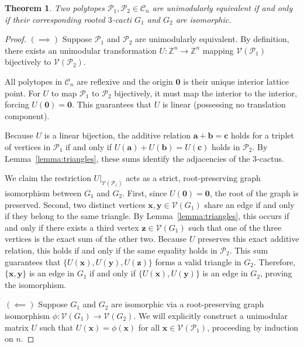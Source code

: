 \documentclass[a4paper,11pt,reqno]{amsart}
\newcommand{\Vv}{{\mathcal V}}
\newtheorem{theorem}{Theorem}[section]
\begin{document}
\begin{theorem} \label{thm:3cactus_iso}
Two polytopes $\mathcal{P}_1, \mathcal{P}_2 \in \mathcal{C}_n$ are unimodularly equivalent if and only if their 
corresponding rooted $3$-cacti $G_1$ and $G_2$ are isomorphic.
\end{theorem}
\begin{proof}
$(\implies)$ Suppose $\mathcal{P}_1$ and $\mathcal{P}_2$ are unimodularly equivalent. By definition, there exists an unimodular 
transformation $U: \mathbb{Z}^n \to \mathbb{Z}^n$ mapping $\Vv(\mathcal{P}_1)$ bijectively to $\Vv(\mathcal{P}_2)$. 
		
All polytopes in $\mathcal{C}_n$ are reflexive and the origin $\bm{0}$ is their unique interior lattice point. For $U$ to map 
$\mathcal{P}_1$ to $\mathcal{P}_2$ bijectively, it must map the interior to the interior, forcing $U(\bm{0}) = \bm{0}$. 
This guarantees that $U$ is linear (possessing no translation component).
		
Because $U$ is a linear bijection, the additive relation $\bm{a} + \bm{b} = \bm{c}$ holds for a triplet of vertices in 
$\mathcal{P}_1$ if and only if $U(\bm{a}) + U(\bm{b}) = U(\bm{c})$ holds in $\mathcal{P}_2$. 
By Lemma~\ref{lemma:triangles}, these sums identify the adjacencies of the $3$-cactus.
		
We claim the restriction $U|_{\Vv(\mathcal{P}_1)}$ acts as a strict, root-preserving graph isomorphism between $G_1$ and $G_2$.
First, since $U(\bm{0}) = \bm{0}$, the root of the graph is preserved. Second, two distinct vertices $\bm{x}, \bm{y} \in \Vv (G_1)$ 
share an edge if and only if they belong to the same triangle. By Lemma~\ref{lemma:triangles}, this occurs if and only if there exists 
a third vertex $\bm{z} \in \Vv (G_1)$ such that one of the three vertices is the exact sum of the other two. Because $U$ preserves 
this exact additive relation, this holds if and only if the same equality holds in $\mathcal{P}_2$. This sum guarantees that 
$\{U(\bm{x}), U(\bm{y}), U(\bm{z})\}$ forms a valid triangle in $G_2$. Therefore, $\{\bm{x}, \bm{y}\}$ is an edge in $G_1$ if and only 
if $\{U(\bm{x}), U(\bm{y})\}$ is an edge in $G_2$, proving the isomorphism.
		
\noindent $(\impliedby)$ Suppose $G_1$ and $G_2$ are isomorphic via a root-preserving graph isomorphism 
$\phi: \Vv (G_1) \to \Vv (G_2)$. We will explicitly construct a unimodular matrix $U$ such that 
$U(\bm{x}) = \phi(\bm{x})$ for all $\bm{x} \in \Vv (\mathcal{P}_1)$, proceeding by induction on $n$.
		

\end{proof}
\end{document}
